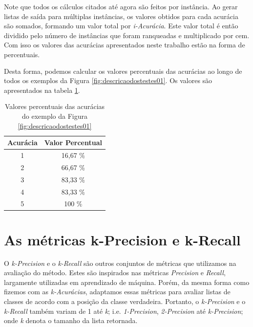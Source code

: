 {Note que todos os cálculos citados até agora são feitos por instância. 
Ao gerar listas de saída para múltiplas instâncias, os valores obtidos para cada acurácia são somados, formando um valor total por \textit{i-Acurácia}.
Este valor total é então dividido pelo número de instâncias que foram ranqueadas e multiplicado por cem.
Com isso os valores das acurácias apresentados neste trabalho estão na forma de percentuais.

Desta forma, podemos calcular os valores percentuais das acurácias ao longo de todos os exemplos da Figura \ref{fig:descricaodostestes01}.
Os valores são apresentados na tabela \ref{tab:valoresacuraciasexemplo}.

\begin{table}[h!]
  \begin{center}
    \begin{tabular}{cc}
      \hline
      \textbf{Acurácia} & \textbf{Valor Percentual} \\
      \hline

      1 & 16,67 \% \\
      2 & 66,67 \% \\
      3 & 83,33 \% \\
      4 & 83,33 \% \\
      5 & 100 \% \\

      \hline
    \end{tabular}
    \caption{Valores percentuais das acurácias do exemplo da Figura \ref{fig:descricaodostestes01}}
    \label{tab:valoresacuraciasexemplo}
  \end{center}
\end{table}

\newpage   
\section{As métricas k-Precision e k-Recall}

O \textit{k-Precision} e o \textit{k-Recall} são outros conjuntos de métricas que utilizamos na avaliação do método.
Estes são inspirados nas métricas \textit{Precision} e \textit{Recall}, largamente utilizadas em aprendizado de máquina.
Porém, da mesma forma como fizemos com as \textit{k-Acurácias}, adaptamos essas métricas para avaliar listas de classes de acordo com a posição da classe verdadeira.
Portanto, o \textit{k-Precision} e o \textit{k-Recall} também variam de 1 até \textit{k}; i.e. \textit{1-Precision}, \textit{2-Precision} até \textit{k-Precision}; onde \textit{k} denota o tamanho da lista retornada.

}
